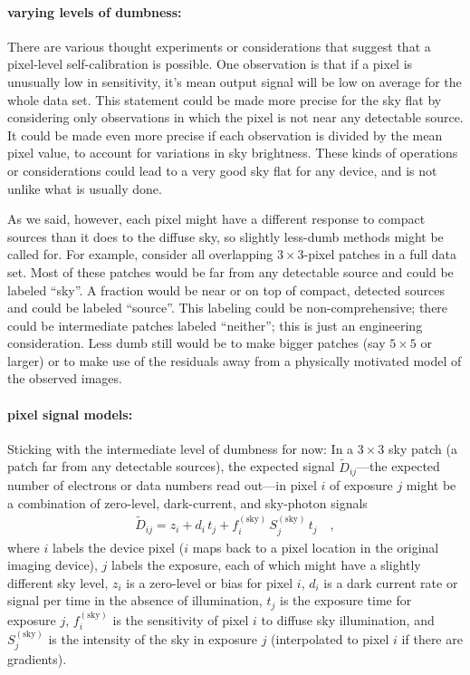 \documentclass[12pt,preprint,dvips]{aastex}
\newcommand{\expectation}[1]{\tilde{#1}}
\newcommand{\sky}{^{(\mathrm{sky})}}
\begin{document}
\paragraph{varying levels of dumbness:}
There are various thought experiments or considerations that suggest
that a pixel-level self-calibration is possible.  One observation is
that if a pixel is unusually low in sensitivity, it's mean output
signal will be low on average for the whole data set.  This statement
could be made more precise for the sky flat by considering only
observations in which the pixel is not near any detectable source.  It
could be made even more precise if each observation is divided by the
mean pixel value, to account for variations in sky brightness.  These
kinds of operations or considerations could lead to a very good sky
flat for any device, and is not unlike what is usually done.

As we said, however, each pixel might have a different response to
compact sources than it does to the diffuse sky, so slightly less-dumb
methods might be called for.  For example, consider all overlapping
$3\times 3$-pixel patches in a full data set.  Most of these patches
would be far from any detectable source and could be labeled ``sky''.
A fraction would be near or on top of compact, detected sources and
could be labeled ``source''.  This labeling could be
non-comprehensive; there could be intermediate patches labeled
``neither''; this is just an engineering consideration.  Less dumb
still would be to make bigger patches (say $5\times 5$ or larger) or
to make use of the residuals away from a physically motivated model of
the observed images.

\paragraph{pixel signal models:}
Sticking with the intermediate level of dumbness for now: In a
$3\times 3$ sky patch (a patch far from any detectable sources), the
expected signal $\expectation{D}_{ij}$---the expected number of
electrons or data numbers read out---in pixel $i$ of exposure $j$
might be a combination of zero-level, dark-current, and sky-photon
signals
\begin{eqnarray}
\expectation{D}_{ij} = z_i + d_i\,t_j + f\sky_i\,S\sky_j\,t_j
\quad ,
\end{eqnarray}
where $i$ labels the device pixel ($i$ maps back to a pixel location
in the original imaging device), $j$ labels the exposure, each of
which might have a slightly different sky level, $z_i$ is a zero-level
or bias for pixel $i$, $d_i$ is a dark current rate or signal per time
in the absence of illumination, $t_j$ is the exposure time for
exposure $j$, $f\sky_i$ is the sensitivity of pixel $i$ to diffuse sky
illumination, and $S\sky_j$ is the intensity of the sky in exposure
$j$ (interpolated to pixel $i$ if there are gradients).
\end{document}
